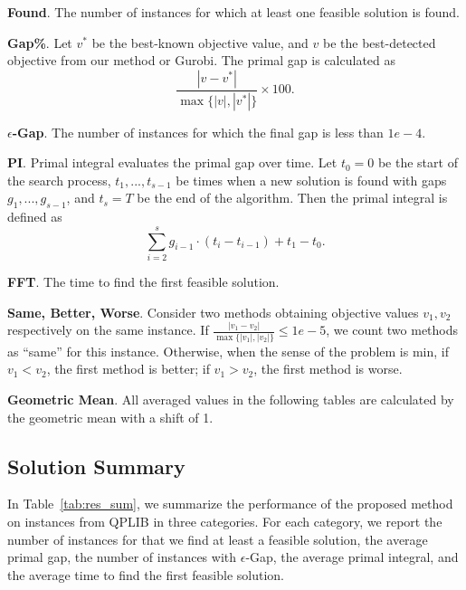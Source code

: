 \documentclass[]{article}
\begin{document}
\textbf{Found}. The number of instances for which at least one feasible solution is found.

\textbf{Gap\%}. Let $v^*$ be the best-known objective value, and $v$ be the best-detected objective from our method or Gurobi. The primal gap is calculated as $$\frac{|v-v^*|}{\max\{|v|,|v^*|\}}\times 100.$$

\textbf{$\epsilon$-Gap}. The number of instances for which the final gap is less than $1e-4$.

\textbf{PI}. Primal integral \cite{berthold2015heuristic} evaluates the primal gap over time. Let $t_0 = 0$ be the start of the search process, $t_1,...,t_{s-1}$ be times when a new solution is found with gaps $g_1, ..., g_{s-1}$, and $t_s = T$ be the end of the algorithm. Then the primal integral is defined as $$\sum_{i=2}^sg_{i-1}\cdot(t_i-t_{i-1}) + t_1-t_0.$$

\textbf{FFT}. The time to find the first feasible solution.

\textbf{Same, Better, Worse}. Consider two methods obtaining objective values $v_1, v_2$ respectively on the same instance. If $\frac{|v_1-v_2|}{\max\{|v_1|,|v_2|\}}\leq 1e-5$, we count two methods as ``same'' for this instance. Otherwise, when the sense of the problem is min, if $v_1 < v_2$, the first method is better; if $v_1 > v_2$, the first method is worse.

\textbf{Geometric Mean}. All averaged values in the following tables are calculated by the geometric mean with a shift of 1. 

\subsection{Solution Summary}
In Table~\ref{tab:res_sum}, we summarize the performance of the proposed method on instances from QPLIB in three categories. For each category, we report the number of instances for that we find at least a feasible solution, the average primal gap, the number of instances with $\epsilon$-Gap, the average primal integral, and the average time to find the first feasible solution.
\end{document}
